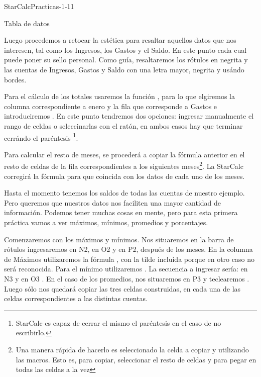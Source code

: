 \begin{figura}{StarCalcPracticas-1-1}{1}
\caption{Tabla de datos}
\end{figura}


Luego procedemos a retocar la estética para resaltar aquellos datos que nos
interesen, tal como los Ingresos, los Gastos y el Saldo. En este punto cada
cual puede poner su sello personal. Como guía, resaltaremos los rótulos en
negrita y las cuentas de Ingresos, Gastos y Saldo con una letra mayor, negrita
y usándo bordes.

Para el cálculo de los totales usaremos la función , para lo que
elgiremos la columna correspondiente a enero y la fila que corresponde a
Gastos e introduciremos . En este punto tendremos dos
opciones: ingresar manualmente el rango de celdas o seleccinarlas con el
ratón, en ambos casos hay que terminar cerrándo el paréntesis
\footnote{StarCalc es capaz de cerrar el mismo el paréntesis en el caso de no
escribirlo.}.

Para calcular el resto de meses, se procederá a copiar la fórmula anterior en
el resto de celdas de la fila correspondientes a los siguientes
meses\footnote{Una manera rápida de hacerlo es seleccionado la celda a copiar
y utilizando las macros. Esto es,  para copiar, seleccionar el
resto de celdas y  para pegar en todas las celdas a la vez}. La
StarCalc corregirá la fórmula para que coincida con los datos de cada uno de
los meses.

Hasta el momento tenemos los saldos de todas las cuentas de nuestro ejemplo.
Pero queremos que nuestros datos nos faciliten una mayor cantidad de
información. Podemos tener muchas cosas en mente, pero para esta primera
práctica vamos a ver máximos, mínimos, promedios y porcentajes.

Comenzaremos con los máximos y mínimos. Nos situaremos en la barra de rótulos
ingresaremos  en N2,  en O2 y
en P2, después de los meses. En la columna de Máximos utilizaremos la fórmula
, con la tilde incluida porque en otro caso no será reconocida.
Para el mínimo utilizaremos . La secuencia a ingresar sería: en
N3  y en O3 . En el caso de los
promedios, nos situaremos en P3 y teclearemos .
Luego sólo nos quedará copiar las tres celdas construidas, en cada una de las
celdas correspondientes a las distintas cuentas.

